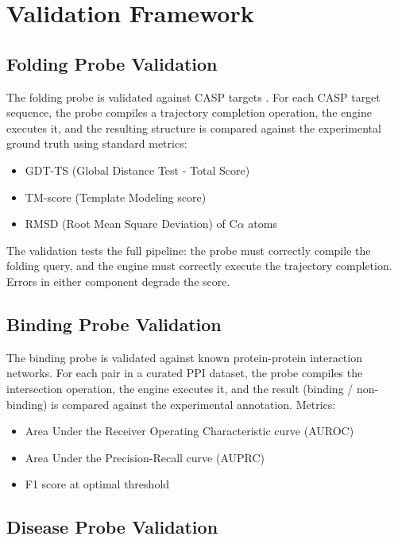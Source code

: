 \documentclass[11pt,twocolumn,a4paper]{article}
\theoremstyle{definition}
\theoremstyle{remark}
\begin{document}
\section{Validation Framework}
\label{sec:validation}

\subsection{Folding Probe Validation}

The folding probe is validated against CASP targets \citep{moult2018}. For each CASP target sequence, the probe compiles a trajectory completion operation, the engine executes it, and the resulting structure is compared against the experimental ground truth using standard metrics:
\begin{itemize}
    \item GDT-TS (Global Distance Test - Total Score)
    \item TM-score (Template Modeling score)
    \item RMSD (Root Mean Square Deviation) of C$\alpha$ atoms
\end{itemize}

The validation tests the full pipeline: the probe must correctly compile the folding query, and the engine must correctly execute the trajectory completion. Errors in either component degrade the score.

\subsection{Binding Probe Validation}

The binding probe is validated against known protein-protein interaction networks. For each pair in a curated PPI dataset, the probe compiles the intersection operation, the engine executes it, and the result (binding / non-binding) is compared against the experimental annotation. Metrics:
\begin{itemize}
    \item Area Under the Receiver Operating Characteristic curve (AUROC)
    \item Area Under the Precision-Recall curve (AUPRC)
    \item F1 score at optimal threshold
\end{itemize}

\subsection{Disease Probe Validation}
\end{document}
